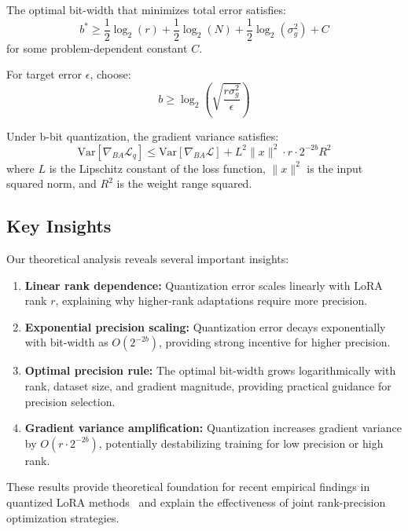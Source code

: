\begin{corollary}
\label{cor:optimal_bits}
The optimal bit-width that minimizes total error satisfies:
\begin{equation}
b^* \geq \frac{1}{2}\log_2(r) + \frac{1}{2}\log_2(N) + \frac{1}{2}\log_2(\sigma_g^2) + C
\end{equation}
for some problem-dependent constant $C$.

For target error $\epsilon$, choose:
\begin{equation}
b \geq \log_2\left(\sqrt{\frac{r \sigma_g^2}{\epsilon}}\right)
\end{equation}
\end{corollary}

\begin{theorem}
\label{thm:grad_variance}
Under b-bit quantization, the gradient variance satisfies:
\begin{equation}
\text{Var}[\nabla_{BA} \mathcal{L}_q] \leq \text{Var}[\nabla_{BA} \mathcal{L}] + L^2 \|x\|^2 \cdot r \cdot 2^{-2b} R^2
\end{equation}
where $L$ is the Lipschitz constant of the loss function, $\|x\|^2$ is the input squared norm, and $R^2$ is the weight range squared.
\end{theorem}

\subsection{Key Insights}

Our theoretical analysis reveals several important insights:

\begin{enumerate}
\item \textbf{Linear rank dependence:} Quantization error scales linearly with LoRA rank $r$, explaining why higher-rank adaptations require more precision.

\item \textbf{Exponential precision scaling:} Quantization error decays exponentially with bit-width as $O(2^{-2b})$, providing strong incentive for higher precision.

\item \textbf{Optimal precision rule:} The optimal bit-width grows logarithmically with rank, dataset size, and gradient magnitude, providing practical guidance for precision selection.

\item \textbf{Gradient variance amplification:} Quantization increases gradient variance by $O(r \cdot 2^{-2b})$, potentially destabilizing training for low precision or high rank.
\end{enumerate}

These results provide theoretical foundation for recent empirical findings in quantized LoRA methods~\cite{qin2024irqlora,zhou2024qradaptor} and explain the effectiveness of joint rank-precision optimization strategies. 